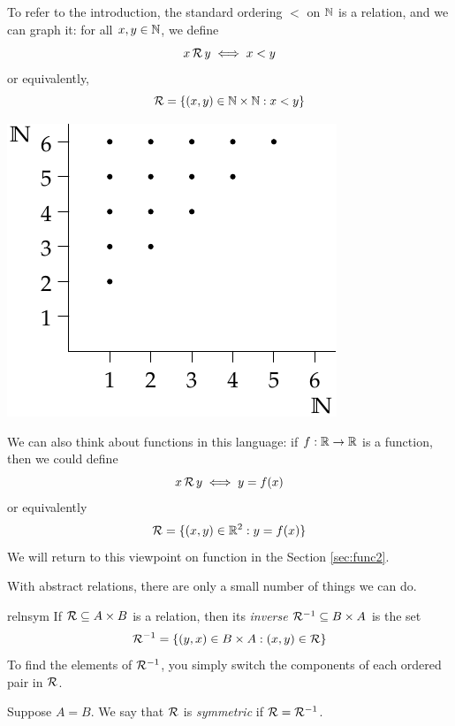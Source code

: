 \begin{minipage}[t]{0.6\linewidth}\vspace{0pt}
	To refer to the introduction, the standard ordering $<$ on $\mathbb{N}$ is a relation, and we can graph it: for all $x,y\in\mathbb{N}$, we define
	\[
		x\,\mathcal{R}\,y\iff x<y
	\]
	or equivalently,
	\[
		\mathcal{R}=\{(x,y)\in\mathbb{N}\times\mathbb{N}:x<y\}
	\]
	\vspace*{10pt}
\end{minipage}
\hfill
\begin{minipage}[t]{0.35\linewidth}\vspace{0pt}
	\includegraphics[width=\textwidth]{relations-25-less}
\end{minipage}\par

We can also think about functions in this language: if $f:\mathbb{R}\to\mathbb{R}$ is a function, then we could define
\[
	x\,\mathcal{R}\,y\iff y=f(x)
\]
or equivalently
\[
	\mathcal{R}=\{(x,y)\in\mathbb{R}^2:y=f(x)\}
\]
We will return to this viewpoint on function in the Section \ref{sec:func2}.



With abstract relations, there are only a small number of things we can do.

\begin{defn}{}{relnsym}
	If $\mathcal{R}\subseteq A\times B$ is a relation, then its \emph{inverse} $\mathcal{R}^{-1}\subseteq B\times A$ is the set
	\[
		\mathcal{R}^{-1}=\{(y,x)\in B\times A:(x,y)\in\mathcal{R}\}
	\]
	To find the elements of $\mathcal{R}^{-1}$, you simply switch the components of each ordered pair in $\mathcal{R}$.\par
	Suppose $A=B$. We say that $\mathcal{R}$ is \emph{symmetric} if $\mathcal{R}=\mathcal{R}^{-1}$.
\end{defn}

